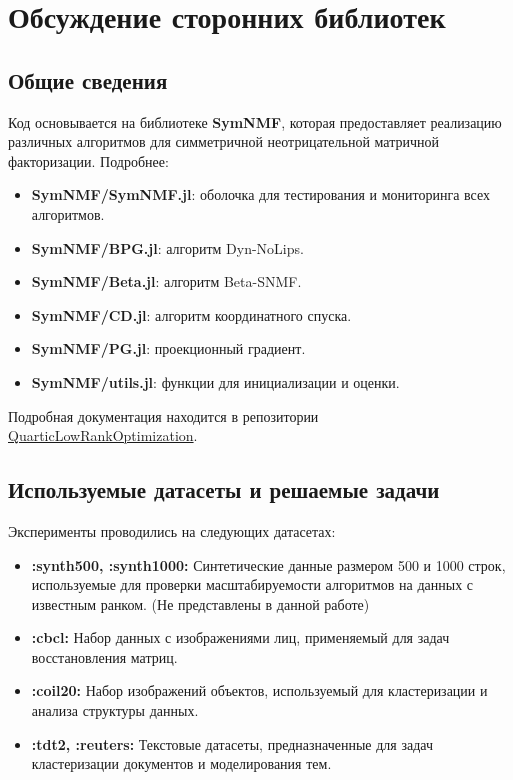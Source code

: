 \documentclass[a4paper,11pt]{article}
\begin{document}
\section{Обсуждение сторонних библиотек}
\label{sec:external-libraries}
\subsection{Общие сведения}
Код основывается на библиотеке \textbf{SymNMF}, которая предоставляет реализацию различных алгоритмов для симметричной неотрицательной матричной факторизации. Подробнее:
\begin{itemize}
    \item \textbf{SymNMF/SymNMF.jl}: оболочка для тестирования и мониторинга всех алгоритмов.
    \item \textbf{SymNMF/BPG.jl}: алгоритм Dyn-NoLips.
    \item \textbf{SymNMF/Beta.jl}: алгоритм Beta-SNMF.
    \item \textbf{SymNMF/CD.jl}: алгоритм координатного спуска.
    \item \textbf{SymNMF/PG.jl}: проекционный градиент.
    \item \textbf{SymNMF/utils.jl}: функции для инициализации и оценки.
\end{itemize}

Подробная документация находится в репозитории \href{https://github.com/RaduAlexandruDragomir/QuarticLowRankOptimization}{QuarticLowRankOptimization}.

\subsection{Используемые датасеты и решаемые задачи}
Эксперименты проводились на следующих датасетах:
\begin{itemize}
    \item \textbf{:synth500, :synth1000:} Синтетические данные размером 500 и 1000 строк, используемые для проверки масштабируемости алгоритмов на данных с известным ранком. (Не представлены в данной работе)
    \item \textbf{:cbcl:} Набор данных с изображениями лиц, применяемый для задач восстановления матриц.
    \item \textbf{:coil20:} Набор изображений объектов, используемый для кластеризации и анализа структуры данных.
    \item \textbf{:tdt2, :reuters:} Текстовые датасеты, предназначенные для задач кластеризации документов и моделирования тем.
\end{itemize}
\end{document}

